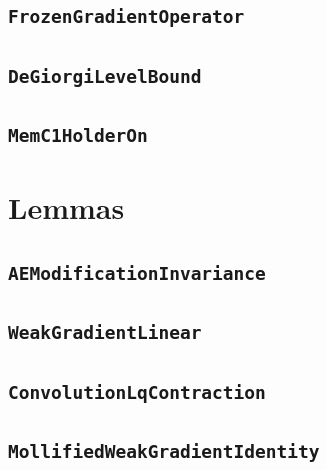 \documentclass[11pt]{amsart}
\theoremstyle{definition}
\begin{document}
\subsection{\texorpdfstring{\texttt{FrozenGradientOperator}}{FrozenGradientOperator}}\label{node:FrozenGradientOperator}


\subsection{\texorpdfstring{\texttt{DeGiorgiLevelBound}}{DeGiorgiLevelBound}}\label{node:DeGiorgiLevelBound}


\subsection{\texorpdfstring{\texttt{MemC1HolderOn}}{MemC1HolderOn}}\label{node:MemC1HolderOn}


\section{Lemmas}
\subsection{\texorpdfstring{\texttt{AEModificationInvariance}}{AEModificationInvariance}}\label{node:AEModificationInvariance}


\subsection{\texorpdfstring{\texttt{WeakGradientLinear}}{WeakGradientLinear}}\label{node:WeakGradientLinear}


\subsection{\texorpdfstring{\texttt{ConvolutionLqContraction}}{ConvolutionLqContraction}}\label{node:ConvolutionLqContraction}


\subsection{\texorpdfstring{\texttt{MollifiedWeakGradientIdentity}}{MollifiedWeakGradientIdentity}}\label{node:MollifiedWeakGradientIdentity}

\end{document}
